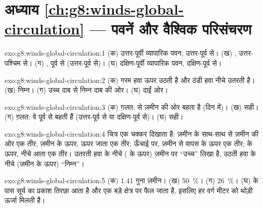 \section*{अध्याय \ref{ch:g8:winds-global-circulation} --- पवनें और वैश्विक परिसंचरण}

\begin{solution}{exo:g8:winds-global-circulation:1}
(क) उत्तर-पूर्वी व्यापारिक पवन, उत्तर-पूर्व से। (ख) , उत्तर-पश्चिम से।
(ग) , पूर्व से (उत्तर-पूर्व से)। (घ) दक्षिण-पूर्वी व्यापारिक पवन,
दक्षिण-पूर्व से।
\end{solution}

\begin{solution}{exo:g8:winds-global-circulation:2}
(क) गरम हवा ऊपर उठती है और ठंडी हवा नीचे उतरती है। (ख) निम्न। (ग) उच्च दाब से निम्न
दाब की ओर। (घ) दाईं ओर।
\end{solution}

\begin{solution}{exo:g8:winds-global-circulation:3}
(क) ग़लत:   से ज़मीन की ओर बहता है (दिन में)। (ख) सही। (ग) ग़लत:
वे पूर्व से बहती हैं (उत्तर-पूर्व से या दक्षिण-पूर्व से)। (घ) सही।
\end{solution}

\begin{solution}{exo:g8:winds-global-circulation:4}
चित्र एक चक्कर दिखाता है: ज़मीन के साथ-साथ  से ज़मीन की ओर एक तीर; ज़मीन के
ऊपर, ऊपर जाता एक तीर; ऊँचाई पर, ज़मीन से वापस  के ऊपर एक तीर;  के ऊपर,
नीचे आता एक तीर। उतरती हवा के नीचे ( के ऊपर) ज़मीन पर ``उच्च'' लिखा है, उठती
हवा के नीचे (ज़मीन के ऊपर) ``निम्न''।
\end{solution}

\begin{solution}{exo:g8:winds-global-circulation:5}
(क) 1.41 गुना ज़मीन। (ख) 50~\%। (ग) 26~\%। (घ)  के पास सूर्य का प्रकाश
तिरछा आता है और एक बड़े क्षेत्र पर फैल जाता है, इसलिए हर वर्ग मीटर को थोड़ी ऊर्जा
मिलती है।
\end{solution}

